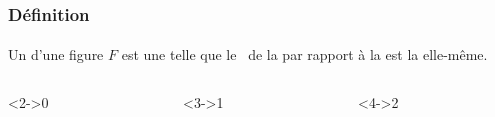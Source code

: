 \documentclass[xcolor={dvipsnames}]{beamer}
\begin{document}
\begin{frame}
\frametitle{Définition}  
\framesubtitle{}

Un \asym d'une figure $F$ est une   telle que le \sym\ de la  par rapport à la  est la  elle-même.

\begin{columns}[c]

\begin{column}{2.2cm}
\begin{exampleblock}<2->{0 \asyms}
\end{exampleblock}	
\end{column}

\begin{column}{2.2cm}
	\begin{exampleblock}<3->{1 \asym }
	\end{exampleblock}	
\end{column}

\begin{column}{2.2cm}
	\begin{exampleblock}<4->{2 \asyms}
	\end{exampleblock}	
\end{column}


\end{columns}
\end{frame}
\end{document}
